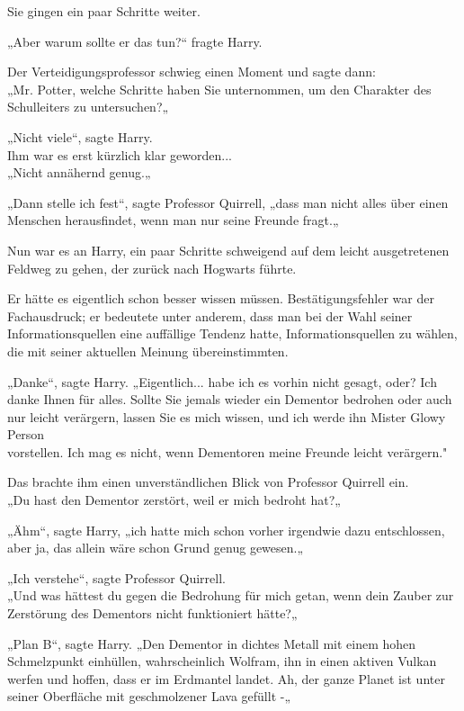 {Sie gingen ein paar Schritte weiter.

„Aber warum sollte er das tun?“ fragte Harry.

Der Verteidigungsprofessor schwieg einen Moment und sagte dann:\\ „Mr. Potter, welche Schritte haben Sie unternommen, um den Charakter des Schulleiters zu untersuchen?„

„Nicht viele“, sagte Harry.\\ Ihm war es erst kürzlich klar geworden...\\ „Nicht annähernd genug.„

„Dann stelle ich fest“, sagte Professor Quirrell, „dass man nicht alles über einen Menschen herausfindet, wenn man nur seine Freunde fragt.„

Nun war es an Harry, ein paar Schritte schweigend auf dem leicht ausgetretenen Feldweg zu gehen, der zurück nach Hogwarts führte.

Er hätte es eigentlich schon besser wissen müssen. Bestätigungsfehler war der Fachausdruck; er bedeutete unter anderem, dass man bei der Wahl seiner Informationsquellen eine auffällige Tendenz hatte, Informationsquellen zu wählen, die mit seiner aktuellen Meinung übereinstimmten.

„Danke“, sagte Harry. „Eigentlich... habe ich es vorhin nicht gesagt, oder? Ich danke Ihnen für alles. Sollte Sie jemals wieder ein Dementor bedrohen oder auch nur leicht verärgern, lassen Sie es mich wissen, und ich werde ihn Mister Glowy Person\\ vorstellen. Ich mag es nicht, wenn Dementoren meine Freunde leicht verärgern."

Das brachte ihm einen unverständlichen Blick von Professor Quirrell ein.\\ „Du hast den Dementor zerstört, weil er mich bedroht hat?„

„Ähm“, sagte Harry, „ich hatte mich schon vorher irgendwie dazu entschlossen, aber ja, das allein wäre schon Grund genug gewesen.„

„Ich verstehe“, sagte Professor Quirrell.\\ „Und was hättest du gegen die Bedrohung für mich getan, wenn dein Zauber zur Zerstörung des Dementors nicht funktioniert hätte?„

„Plan B“, sagte Harry. „Den Dementor in dichtes Metall mit einem hohen Schmelzpunkt einhüllen, wahrscheinlich Wolfram, ihn in einen aktiven Vulkan werfen und hoffen, dass er im Erdmantel landet. Ah, der ganze Planet ist unter seiner Oberfläche mit geschmolzener Lava gefüllt -„

}
